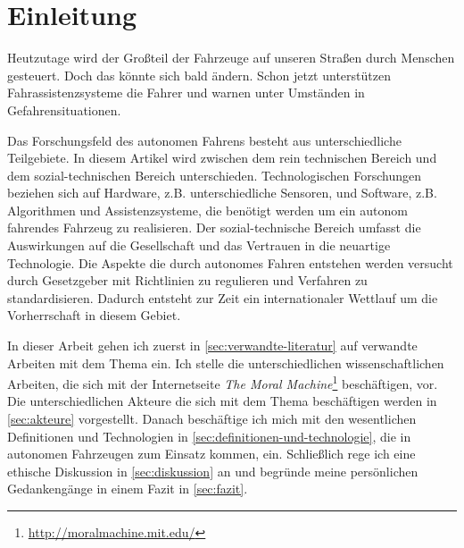 \section{Einleitung}

Heutzutage wird der Großteil der Fahrzeuge auf unseren Straßen durch Menschen gesteuert. Doch das könnte sich bald ändern. Schon jetzt unterstützen Fahrassistenzsysteme die Fahrer und warnen unter Umständen in Gefahrensituationen.

Das Forschungsfeld des autonomen Fahrens besteht aus unterschiedliche Teilgebiete. In diesem Artikel wird  zwischen dem rein technischen Bereich und dem sozial-technischen Bereich unterschieden. Technologischen Forschungen beziehen sich auf Hardware, z.B. unterschiedliche Sensoren, und Software, z.B. Algorithmen und Assistenzsysteme, die benötigt werden um ein autonom fahrendes Fahrzeug zu realisieren. Der sozial-technische Bereich umfasst die Auswirkungen auf die Gesellschaft und das Vertrauen in die neuartige Technologie. Die Aspekte die durch autonomes Fahren entstehen werden versucht durch Gesetzgeber mit Richtlinien zu regulieren und Verfahren zu standardisieren. Dadurch entsteht zur Zeit ein internationaler Wettlauf um die Vorherrschaft in diesem Gebiet.

In dieser Arbeit gehen ich zuerst in \ref{sec:verwandte-literatur} auf  verwandte Arbeiten mit dem Thema ein. Ich stelle die unterschiedlichen wissenschaftlichen Arbeiten, die sich mit der Internetseite \textit{The Moral Machine}\footnote{\url{http://moralmachine.mit.edu/}} beschäftigen, vor. Die unterschiedlichen Akteure die sich mit dem Thema beschäftigen werden in \ref{sec:akteure} vorgestellt. Danach beschäftige ich mich mit den wesentlichen Definitionen und Technologien in \ref{sec:definitionen-und-technologie}, die in autonomen Fahrzeugen zum Einsatz kommen, ein. Schließlich rege ich eine ethische Diskussion in \ref{sec:diskussion} an und begründe meine persönlichen Gedankengänge in einem Fazit in \ref{sec:fazit}.